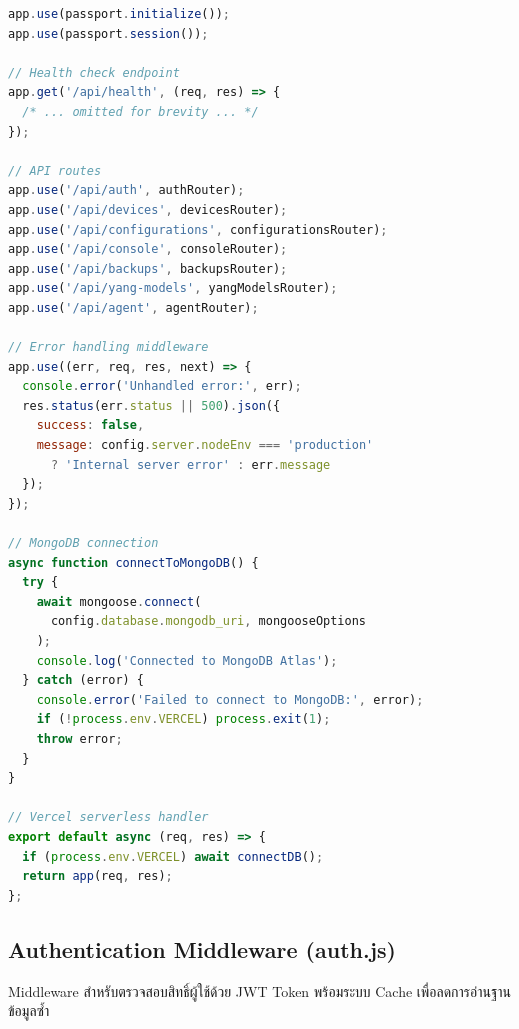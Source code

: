 \begin{lstlisting}[language=JavaScript, caption={server.js -- Express Server Setup}]
app.use(passport.initialize());
app.use(passport.session());

// Health check endpoint
app.get('/api/health', (req, res) => {
  /* ... omitted for brevity ... */
});

// API routes
app.use('/api/auth', authRouter);
app.use('/api/devices', devicesRouter);
app.use('/api/configurations', configurationsRouter);
app.use('/api/console', consoleRouter);
app.use('/api/backups', backupsRouter);
app.use('/api/yang-models', yangModelsRouter);
app.use('/api/agent', agentRouter);

// Error handling middleware
app.use((err, req, res, next) => {
  console.error('Unhandled error:', err);
  res.status(err.status || 500).json({
    success: false,
    message: config.server.nodeEnv === 'production'
      ? 'Internal server error' : err.message
  });
});

// MongoDB connection
async function connectToMongoDB() {
  try {
    await mongoose.connect(
      config.database.mongodb_uri, mongooseOptions
    );
    console.log('Connected to MongoDB Atlas');
  } catch (error) {
    console.error('Failed to connect to MongoDB:', error);
    if (!process.env.VERCEL) process.exit(1);
    throw error;
  }
}

// Vercel serverless handler
export default async (req, res) => {
  if (process.env.VERCEL) await connectDB();
  return app(req, res);
};
\end{lstlisting}

\subsection{Authentication Middleware (auth.js)}
\hspace*{1.3em}
Middleware สำหรับตรวจสอบสิทธิ์ผู้ใช้ด้วย JWT Token พร้อมระบบ Cache เพื่อลดการอ่านฐานข้อมูลซ้ำ

